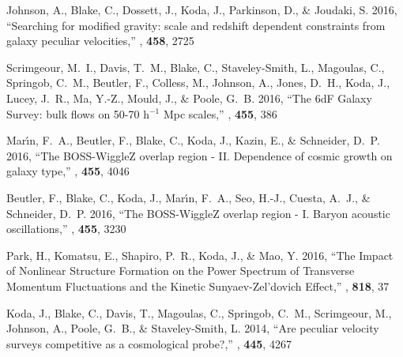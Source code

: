 \begin{thebibliography}{8}
{Johnson}, A., {Blake}, C., {Dossett}, J., {Koda}, J., {Parkinson}, D., \&
  {Joudaki}, S. 2016, ``{Searching for modified gravity: scale and redshift
  dependent constraints from galaxy peculiar velocities},'' {\em \mnras\/},
  {\bf 458}, 2725

{Scrimgeour}, M.~I., {Davis}, T.~M., {Blake}, C., {Staveley-Smith}, L.,
  {Magoulas}, C., {Springob}, C.~M., {Beutler}, F., {Colless}, M., {Johnson},
  A., {Jones}, D.~H., {Koda}, J., {Lucey}, J.~R., {Ma}, Y.-Z., {Mould}, J., \&
  {Poole}, G.~B. 2016, ``{The 6dF Galaxy Survey: bulk flows on 50-70 h$^{-1}$
  Mpc scales},'' {\em \mnras\/}, {\bf 455}, 386

{Mar{\'{\i}}n}, F.~A., {Beutler}, F., {Blake}, C., {Koda}, J., {Kazin}, E., \&
  {Schneider}, D.~P. 2016, ``{The BOSS-WiggleZ overlap region - II. Dependence
  of cosmic growth on galaxy type},'' {\em \mnras\/}, {\bf 455}, 4046

{Beutler}, F., {Blake}, C., {Koda}, J., {Mar{\'{\i}}n}, F.~A., {Seo}, H.-J.,
  {Cuesta}, A.~J., \& {Schneider}, D.~P. 2016, ``{The BOSS-WiggleZ overlap
  region - I. Baryon acoustic oscillations},'' {\em \mnras\/}, {\bf 455}, 3230

{Park}, H., {Komatsu}, E., {Shapiro}, P.~R., {Koda}, J., \& {Mao}, Y. 2016,
  ``{The Impact of Nonlinear Structure Formation on the Power Spectrum of
  Transverse Momentum Fluctuations and the Kinetic Sunyaev-Zel'dovich
  Effect},'' {\em \apj\/}, {\bf 818}, 37

{Koda}, J., {Blake}, C., {Davis}, T., {Magoulas}, C., {Springob}, C.~M.,
  {Scrimgeour}, M., {Johnson}, A., {Poole}, G.~B., \& {Staveley-Smith}, L.
  2014, ``{Are peculiar velocity surveys competitive as a cosmological
  probe?},'' {\em \mnras\/}, {\bf 445}, 4267


\end{thebibliography}
